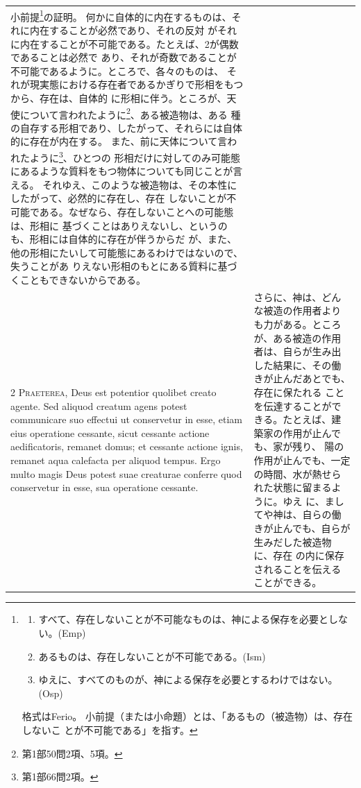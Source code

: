 \documentclass[paper=a4paper,fontsize=10pt,jafontsize=9pt,titlepage]{jlreq}
\begin{document}
\begin{longtable}{p{21em}p{21em}}
小前提\footnote{
\begin{enumerate}
 \item すべて、存在しないことが不可能なものは、神による保存を必要としな
       い。(Emp)
 \item あるものは、存在しないことが不可能である。(Ism)
 \item ゆえに、すべてのものが、神による保存を必要とするわけではない。(Osp)
\end{enumerate}
格式はFerio。
小前提（または小命題）とは、「あるもの（被造物）は、存在しないこ
 とが不可能である」を指す。}の証明。
何かに自体的に内在するものは、それに内在することが必然であり、それの反対
 がそれに内在することが不可能である。たとえば、2が偶数であることは必然で
 あり、それが奇数であることが不可能であるように。ところで、各々のものは、
 それが現実態における存在者であるかぎりで形相をもつから、存在は、自体的
 に形相に伴う。ところが、天使について言われたように\footnote{第1部50問2項、5項。}、ある被造物は、ある
 種の自存する形相であり、したがって、それらには自体的に存在が内在する。
また、前に天体について言われたように\footnote{第1部66問2項。}、ひとつの
 形相だけに対してのみ可能態にあるような質料をもつ物体についても同じことが言える。
それゆえ、このような被造物は、その本性にしたがって、必然的に存在し、存在
 しないことが不可能である。なぜなら、存在しないことへの可能態は、形相に
 基づくことはありえないし、というのも、形相には自体的に存在が伴うからだ
 が、また、他の形相にたいして可能態にあるわけではないので、失うことがあ
 りえない形相のもとにある質料に基づくこともできないからである。

\\


{\scshape 2 Praeterea}, Deus est potentior quolibet
creato agente. Sed aliquod creatum agens potest communicare suo effectui
ut conservetur in esse, etiam eius operatione cessante, sicut cessante
actione aedificatoris, remanet domus; et cessante actione ignis, remanet
aqua calefacta per aliquod tempus. Ergo multo magis Deus potest suae
creaturae conferre quod conservetur in esse, sua operatione cessante.

&

さらに、神は、どんな被造の作用者よりも力がある。ところが、ある被造の作用
 者は、自らが生み出した結果に、その働きが止んだあとでも、存在に保たれる
 ことを伝達することができる。たとえば、建築家の作用が止んでも、家が残り、
 陽の作用が止んでも、一定の時間、水が熱せられた状態に留まるように。ゆえ
 に、ましてや神は、自らの働きが止んでも、自らが生みだした被造物に、存在
 の内に保存されることを伝えることができる。


\end{longtable}
\end{document}
